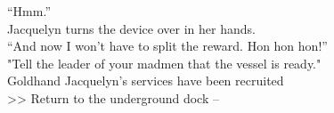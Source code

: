“Hmm.”\\

Jacquelyn turns the device over in her hands.\\

“And now I won’t have to split the reward. Hon hon hon!”\\

"Tell the leader of your madmen that the vessel is ready."\\

 Goldhand Jacquelyn’s services have been recruited\\
>> Return to the underground dock -- 